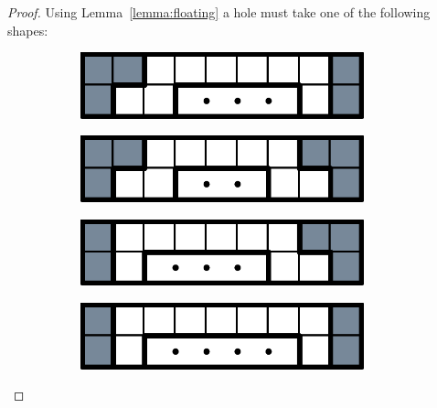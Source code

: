\begin{proof}
Using Lemma~\ref{lemma:floating} a hole must take one of the following shapes:

\begin{figure}[ht]
  \centering
  \begin{subfigure}[b]{0.24\textwidth}
    \centering
    \includegraphics[width=0.9\textwidth]{pictures/dominoes/row-holes/simple-hole-1.pdf}
    \caption{}
    \label{dom:hole-a}
  \end{subfigure}
  \begin{subfigure}[b]{0.24\textwidth}
    \centering
    \includegraphics[width=0.9\textwidth]{pictures/dominoes/row-holes/simple-hole-2.pdf}
    \caption{}
    \label{dom:hole-b}
  \end{subfigure}
  \begin{subfigure}[b]{0.24\textwidth}
    \centering
    \includegraphics[width=0.9\textwidth]{pictures/dominoes/row-holes/simple-hole-3.pdf}
    \caption{}
    \label{dom:hole-c}
  \end{subfigure}
  \begin{subfigure}[b]{0.24\textwidth}
    \centering
    \includegraphics[width=0.9\textwidth]{pictures/dominoes/row-holes/simple-hole-4.pdf}
    \caption{}
    \label{dom:hole-d}
  \end{subfigure}
  \label{dom:holes}
\end{figure}


\end{proof}
